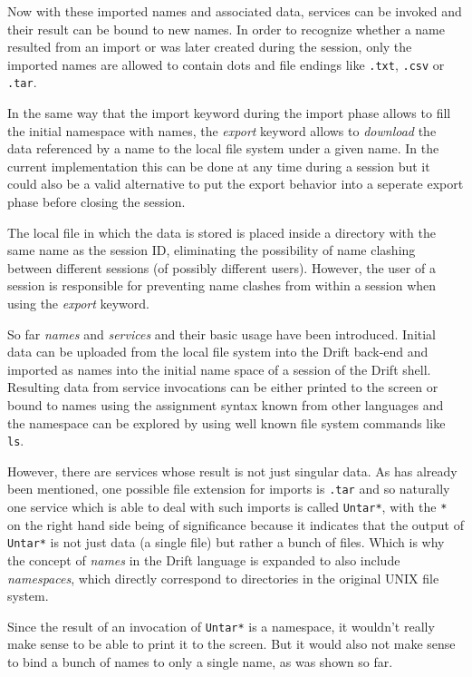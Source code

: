 Now with these imported names and associated data, services can
be invoked and their result can be bound to new names. In order
to recognize whether a name resulted from an import or was later
created during the session, only the imported names are allowed
to contain dots and file endings like \texttt{.txt}, \texttt{.csv}
or \texttt{.tar}.

In the same way that the import keyword during the import phase
allows to fill the initial namespace with names, the \textit{export}
keyword allows to \textit{download} the data referenced by a name
to the local file system under a given name. In the current
implementation this can be done at any time during a session
but it could also be a valid alternative to put the export
behavior into a seperate export phase before closing the session.

The local file in which the data is stored is placed inside a
directory with the same name as the session ID, eliminating the
possibility of name clashing between different sessions (of
possibly different users). However, the user of a session is
responsible for preventing name clashes from within a session
when using the \textit{export} keyword.
\newline

So far \textit{names} and \textit{services} and their basic
usage have been introduced. Initial data can be uploaded from
the local file system into the Drift back-end and imported as
names into the initial name space of a session of the Drift shell.
Resulting data from service invocations can be either printed
to the screen or bound to names using the assignment syntax known
from other languages and the namespace can be explored by using
well known file system commands like \texttt{ls}.

However, there are services whose result is not just singular data.
As has already been mentioned, one possible file extension for
imports is \texttt{.tar} and so naturally one service which is
able to deal with such imports is called \texttt{Untar*},
with the \texttt{*} on the right hand side being of significance
because it indicates that the output of \texttt{Untar*} is not
just data (a single file) but rather a bunch of files.
Which is why the concept of \textit{names} in the Drift language
is expanded to also include \textit{namespaces}, which directly
correspond to directories in the original UNIX file system.

Since the result of an invocation of \texttt{Untar*} is a
namespace, it wouldn't really make sense to be able to print
it to the screen. But it would also not make sense to bind
a bunch of names to only a single name, as was shown so far.

